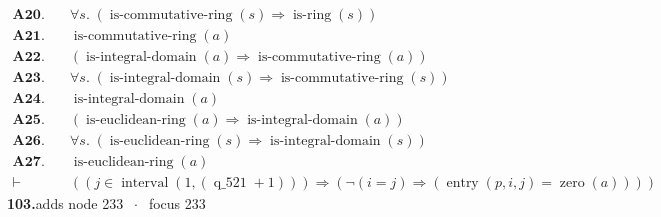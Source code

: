 \documentclass[11pt]{article}
\theoremstyle{plain}
\newcommand{\fit}[1]{\resizebox{\ifdim\width>\linewidth\linewidth\else\width\fi}{!}{#1}}
\begin{document}
\begin{align*}
  \mathbf{A20.}\quad & \forall s.\; (\operatorname{is\text{-}commutative\text{-}ring}(s) \Rightarrow \operatorname{is\text{-}ring}(s)) \\
  \mathbf{A21.}\quad & \operatorname{is\text{-}commutative\text{-}ring}(a) \\
  \mathbf{A22.}\quad & (\operatorname{is\text{-}integral\text{-}domain}(a) \Rightarrow \operatorname{is\text{-}commutative\text{-}ring}(a)) \\
  \mathbf{A23.}\quad & \forall s.\; (\operatorname{is\text{-}integral\text{-}domain}(s) \Rightarrow \operatorname{is\text{-}commutative\text{-}ring}(s)) \\
  \mathbf{A24.}\quad & \operatorname{is\text{-}integral\text{-}domain}(a) \\
  \mathbf{A25.}\quad & (\operatorname{is\text{-}euclidean\text{-}ring}(a) \Rightarrow \operatorname{is\text{-}integral\text{-}domain}(a)) \\
  \mathbf{A26.}\quad & \forall s.\; (\operatorname{is\text{-}euclidean\text{-}ring}(s) \Rightarrow \operatorname{is\text{-}integral\text{-}domain}(s)) \\
  \mathbf{A27.}\quad & \operatorname{is\text{-}euclidean\text{-}ring}(a) \\
  \vdash\quad & ((j \in \operatorname{interval}(1, (\operatorname{q\_521} + 1))) \Rightarrow (\neg (i = j) \Rightarrow (\operatorname{entry}(p, i, j) = \operatorname{zero}(a))))
\end{align*}
\medskip\noindent\textbf{103.}\quad \fit{\texttt{(di)}}\hfill{\small adds node 233 $\;\cdot\;$ focus 233}\\[2pt]
\end{document}
